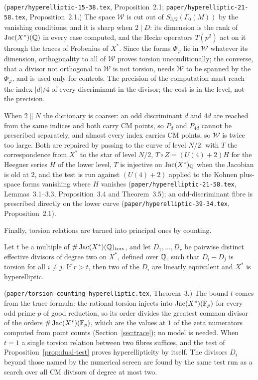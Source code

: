 (\texttt{paper/hyperelliptic-15-38.tex}, Proposition~2.1; \texttt{paper/hyperelliptic-21-58.tex},
Proposition~2.1.) The space $\mathcal W$ is cut out of $S_{3/2}(\Gamma_0(M))$ by the vanishing conditions, and
it is sharp when $2\mid D$: its dimension is the rank of $\operatorname{Jac}(X^*)(\mathbb{Q})$ in every case computed, and the Hecke
operators $T(p^2)$ act on it through the traces of Frobenius of $X^*$. Since the forms $\Phi_\varphi$ lie in
$\mathcal W$ whatever its dimension, orthogonality to all of $\mathcal W$ proves torsion unconditionally; the
converse, that a divisor not orthogonal to $\mathcal W$ is not torsion, needs $\mathcal W$ to be spanned by the
$\Phi_\varphi$, and is used only for controls. The precision of the computation must reach the index $|d|/4$ of
every discriminant in the divisor; the cost is in the level, not the precision.

When $2\parallel N$ the dictionary is coarser: an odd discriminant $d$ and $4d$ are reached from the same
indices and both carry CM points, so $P_d$ and $P_{4d}$ cannot be prescribed separately, and almost every index
carries CM points, so $\mathcal W$ is twice too large. Both are repaired by passing to the curve of level $N/2$:
with $T$ the correspondence from $X^*$ to the star of level $N/2$, $T\circ Z=(U(4)+2)H$ for the Heegner series
$H$ of the lower level, $T$ is injective on $\operatorname{Jac}(X^*)_{\mathbb{Q}}$ when the Jacobian is old at $2$, and the test is run
against $(U(4)+2)$ applied to the Kohnen plus-space forms vanishing where $H$ vanishes
(\texttt{paper/hyperelliptic-21-58.tex}, Lemmas~3.1--3.3, Proposition~3.4 and Theorem~3.5); an odd-discriminant
fibre is prescribed directly on the lower curve (\texttt{paper/hyperelliptic-39-34.tex}, Proposition~2.1).

Finally, torsion relations are turned into principal ones by counting.

\begin{theorem}[counting]\label{thm:counting}
Let $t$ be a multiple of $\#\operatorname{Jac}(X^*)(\mathbb{Q})_{\mathrm{tors}}$, and let $D_1,\dots,D_r$ be pairwise distinct
effective divisors of degree two on $X^*$, defined over $\mathbb{Q}$, such that $D_i-D_j$ is torsion for all $i\neq j$.
If $r>t$, then two of the $D_i$ are linearly equivalent and $X^*$ is hyperelliptic.
\end{theorem}

(\texttt{paper/torsion-counting-hyperelliptic.tex}, Theorem~3.) The bound $t$ comes from the trace formula: the
rational torsion injects into $\operatorname{Jac}(X^*)(\mathbb{F}_p)$ for every odd prime $p$ of good reduction, so its order divides
the greatest common divisor of the orders $\#\operatorname{Jac}(X^*)(\mathbb{F}_p)$, which are the values at $1$ of the zeta numerators
computed from point counts (Section~\ref{sec:trace}); no model is needed. When $t=1$ a single torsion relation
between two fibres suffices, and the test of Proposition~\ref{prop:dual-test} proves hyperellipticity by itself.
The divisors $D_i$ beyond those named by the numerical screen are found by the same test run as a search over
all CM divisors of degree at most two.

